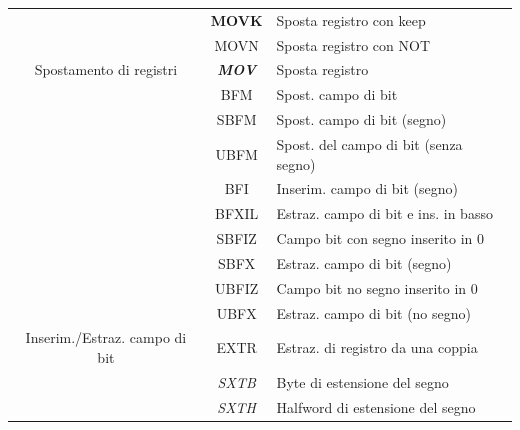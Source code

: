 \documentclass[12pt,a4paper]{article}
\begin{document}
\begin{longtable}{|c|c|l|}
                                                           & \textbf{MOVK}         & Sposta registro con keep                           \\ \cline{2-3} 
                                                           & MOVN                  & Sposta registro con NOT                            \\ \cline{2-3} 
\multirow{-4}{*}{Spostamento di registri}                  & \textit{\textbf{MOV}} & Sposta registro                                    \\ \hline
                                                           & BFM                   & Spost. campo di bit                       \\ \cline{2-3} 
                                                           & SBFM                  & Spost. campo di bit (segno)           \\ \cline{2-3} 
                                                           & UBFM                  & Spost. del campo di bit (senza segno)         \\ \cline{2-3} 
                                                           & BFI                   & Inserim. campo di bit (segno)           \\ \cline{2-3} 
                                                           & BFXIL                 & Estraz. campo di bit e ins. in basso \\ \cline{2-3} 
                                                           & SBFIZ                 & Campo bit con segno inserito in 0                  \\ \cline{2-3} 
                                                           & SBFX                  & Estraz. campo di bit (segno)            \\ \cline{2-3} 
                                                           & UBFIZ                 & Campo bit no segno inserito in 0                \\ \cline{2-3} 
                                                           & UBFX                  & Estraz. campo di bit (no segno)          \\ \cline{2-3} 
\multirow{-10}{*}{Inserim./Estraz. campo di bit} & EXTR                  & Estraz. di registro da una coppia               \\ \hline
                                                           & \textit{SXTB}         & Byte di estensione del segno                       \\ \cline{2-3} 
                                                           & \textit{SXTH}         & Halfword di estensione del segno                   \\ \cline{2-3} 

\end{longtable}
\end{document}
